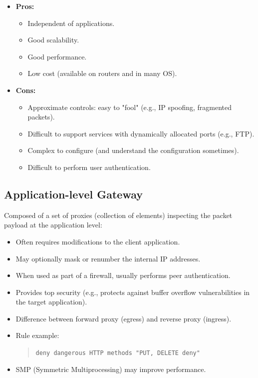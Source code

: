 \begin{itemize}
    \item \textbf{Pros:}
    \begin{itemize}
        \item Independent of applications.
        \item Good scalability.
        \item Good performance.
        \item Low cost (available on routers and in many OS).
    \end{itemize}
    \item \textbf{Cons:}
    \begin{itemize}
        \item Approximate controls: easy to "fool" (e.g., IP spoofing, fragmented packets).
        \item Difficult to support services with dynamically allocated ports (e.g., FTP).
        \item Complex to configure (and understand the configuration sometimes).
        \item Difficult to perform user authentication.
    \end{itemize}
\end{itemize}

\subsection{Application-level Gateway}
Composed of a set of proxies (collection of elements) inspecting the packet payload at the application level:
\begin{itemize}
    \item Often requires modifications to the client application.
    \item May optionally mask or renumber the internal IP addresses.
    \item When used as part of a firewall, usually performs peer authentication.
    \item Provides top security (e.g., protects against buffer overflow vulnerabilities in the target application).
    \item Difference between forward proxy (egress) and reverse proxy (ingress).
    \item Rule example:
    \begin{quote}
        \texttt{deny dangerous HTTP methods "PUT, DELETE deny"}
    \end{quote}
    \item SMP (Symmetric Multiprocessing) may improve performance.
\end{itemize}

